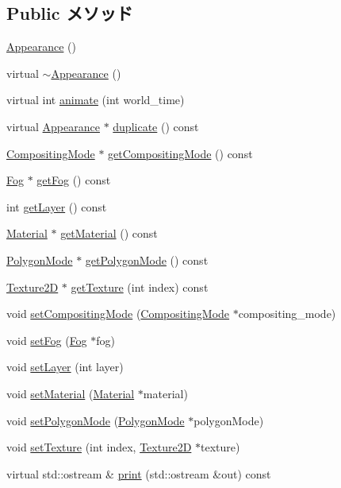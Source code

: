 \subsection*{Public メソッド}
\begin{CompactItemize}
\item 
\hyperlink{classm3g_1_1Appearance_2e594c7b96cb5cfad839a98b57f5d42f}{Appearance} ()
\item 
virtual \hyperlink{classm3g_1_1Appearance_c05c93d7a0f286cb9471b6c667ffeee1}{$\sim$Appearance} ()
\item 
virtual int \hyperlink{classm3g_1_1Appearance_8aad1ceab4c2a03609c8a42324ce484d}{animate} (int world\_\-time)
\item 
virtual \hyperlink{classm3g_1_1Appearance}{Appearance} $\ast$ \hyperlink{classm3g_1_1Appearance_ceaab703eb45cba7cf8705bc3a087127}{duplicate} () const 
\item 
\hyperlink{classm3g_1_1CompositingMode}{CompositingMode} $\ast$ \hyperlink{classm3g_1_1Appearance_e4045934febb56891c15e14486b239a8}{getCompositingMode} () const 
\item 
\hyperlink{classm3g_1_1Fog}{Fog} $\ast$ \hyperlink{classm3g_1_1Appearance_93143a921b998ff69576147a59eb44d4}{getFog} () const 
\item 
int \hyperlink{classm3g_1_1Appearance_df831e0e0ebf9d7e997150e497e6a6cf}{getLayer} () const 
\item 
\hyperlink{classm3g_1_1Material}{Material} $\ast$ \hyperlink{classm3g_1_1Appearance_a412c7074ed5d51f6b8b6fd89275c405}{getMaterial} () const 
\item 
\hyperlink{classm3g_1_1PolygonMode}{PolygonMode} $\ast$ \hyperlink{classm3g_1_1Appearance_dd3ddcefcd18339150d281b155602886}{getPolygonMode} () const 
\item 
\hyperlink{classm3g_1_1Texture2D}{Texture2D} $\ast$ \hyperlink{classm3g_1_1Appearance_987cc21bd78d0e4e664da717479bdd57}{getTexture} (int index) const 
\item 
void \hyperlink{classm3g_1_1Appearance_8f9514f1c01268fff95b7c31f3a194b6}{setCompositingMode} (\hyperlink{classm3g_1_1CompositingMode}{CompositingMode} $\ast$compositing\_\-mode)
\item 
void \hyperlink{classm3g_1_1Appearance_bc1a612006d6b4c3d443ff6ab542c788}{setFog} (\hyperlink{classm3g_1_1Fog}{Fog} $\ast$fog)
\item 
void \hyperlink{classm3g_1_1Appearance_fbd2fbd594c8ee140b028f505631f682}{setLayer} (int layer)
\item 
void \hyperlink{classm3g_1_1Appearance_1dfd1a55fa3cc625719dab8e95c8a2de}{setMaterial} (\hyperlink{classm3g_1_1Material}{Material} $\ast$material)
\item 
void \hyperlink{classm3g_1_1Appearance_cc21fac7868e2ad37e689ac642db1aae}{setPolygonMode} (\hyperlink{classm3g_1_1PolygonMode}{PolygonMode} $\ast$polygonMode)
\item 
void \hyperlink{classm3g_1_1Appearance_493e54b1c7ab839b9e76b28e0629cf6a}{setTexture} (int index, \hyperlink{classm3g_1_1Texture2D}{Texture2D} $\ast$texture)
\item 
virtual std::ostream \& \hyperlink{classm3g_1_1Appearance_6fea17fa1532df3794f8cb39cb4f911f}{print} (std::ostream \&out) const 
\end{CompactItemize}
